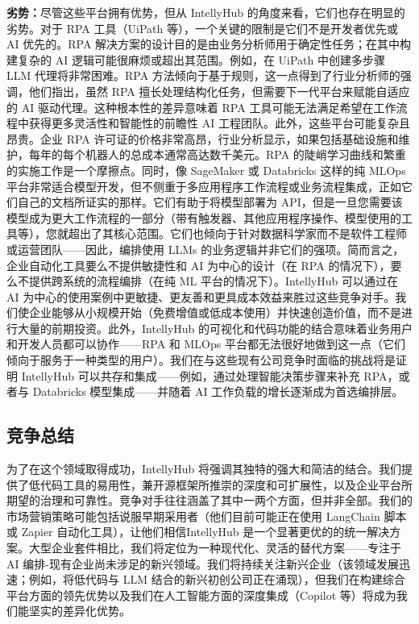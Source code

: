 \documentclass[11点, A4纸, 单面]{article}
\begin{document}
\textbf{劣势：}尽管这些平台拥有优势，但从 IntellyHub 的角度来看，它们也存在明显的劣势。对于 RPA 工具（UiPath 等），一个关键的限制是它们不是开发者优先或 AI 优先的。RPA 解决方案的设计目的是由业务分析师用于确定性任务；在其中构建复杂的 AI 逻辑可能很麻烦或超出其范围。例如，在 UiPath 中创建多步骤 LLM 代理将非常困难。RPA 方法倾向于基于规则，这一点得到了行业分析师的强调，他们指出，虽然 RPA 擅长处理结构化任务，但需要下一代平台来赋能自适应的 AI 驱动代理\cite{forresterRPAvsAI}。这种根本性的差异意味着 RPA 工具可能无法满足希望在工作流程中获得更多灵活性和智能性的前瞻性 AI 工程团队。此外，这些平台可能复杂且昂贵。企业 RPA 许可证的价格非常高昂，行业分析显示，如果包括基础设施和维护，每年的每个机器人的总成本通常高达数千美元。RPA 的陡峭学习曲线和繁重的实施工作是一个摩擦点。同时，像 SageMaker 或 Databricks 这样的纯 MLOps 平台非常适合模型开发，但不侧重于多应用程序工作流程或业务流程集成，正如它们自己的文档所证实的那样\cite{awsSagemaker}。它们有助于将模型部署为 API，但是一旦您需要该模型成为更大工作流程的一部分（带有触发器、其他应用程序操作、模型使用的工具等），您就超出了其核心范围。它们也倾向于针对数据科学家而不是软件工程师或运营团队——因此，编排使用 LLMs 的业务逻辑并非它们的强项。简而言之，企业自动化工具要么不提供敏捷性和 AI 为中心的设计（在 RPA 的情况下），要么不提供跨系统的流程编排（在纯 ML 平台的情况下）。IntellyHub 可以通过在 AI 为中心的使用案例中更敏捷、更友善和更具成本效益来胜过这些竞争对手。我们使企业能够从小规模开始（免费增值或低成本使用）并快速创造价值，而不是进行大量的前期投资。此外，IntellyHub 的可视化和代码功能的结合意味着业务用户和开发人员都可以协作——RPA 和 MLOps 平台都无法很好地做到这一点（它们倾向于服务于一种类型的用户）。我们在与这些现有公司竞争时面临的挑战将是证明 IntellyHub 可以共存和集成——例如，通过处理智能决策步骤来补充 RPA，或者与 Databricks 模型集成——并随着 AI 工作负载的增长逐渐成为首选编排层。

\subsection{竞争总结}

为了在这个领域取得成功，IntellyHub 将强调其独特的强大和简洁的结合。我们提供了低代码工具的易用性，兼开源框架所推崇的深度和可扩展性，以及企业平台所期望的治理和可靠性。竞争对手往往涵盖了其中一两个方面，但并非全部。我们的市场营销策略可能包括说服早期采用者（他们目前可能正在使用 LangChain 脚本或 Zapier 自动化工具），让他们相信IntellyHub 是一个显著更优的的统一解决方案。大型企业套件相比，我们将定位为一种现代化、灵活的替代方案——专注于 AI 编排-现有企业尚未涉足的新兴领域。我们将持续关注新兴企业（该领域发展迅速；例如，将低代码与 LLM 结合的新兴初创公司正在涌现），但我们在构建综合平台方面的领先优势以及我们在人工智能方面的深度集成（Copilot 等）将成为我们能坚实的差异化优势。
\end{document}
